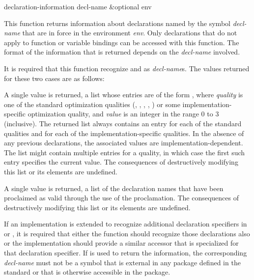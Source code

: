 \begin{defun}[Function]
declaration-information decl-name &optional env

  This function returns information about declarations named by the
  symbol \emph{decl-name} that are in force in the environment \emph{env}.
  Only declarations that do not apply to function or variable bindings
  can be accessed with this function.  The format of the information
  that is returned depends on the \emph{decl-name} involved.

  It is required that this function recognize  and  as
  \emph{decl-name\/}s.  The values returned for these two cases are as follows:
\begin{indentdesc}{7pc}
\item[\cdf{optimize}]
A single value is returned,
a list whose entries are of the form , where
                \emph{quality} is one of the standard optimization qualities
                (, , , , )
                or some implementation-specific optimization quality, and
                \emph{value} is an integer in the range 0 to 3 (inclusive).
                The returned list
                always contains an entry for each of the standard qualities and
                for each of the implementation-specific qualities.  In the
                absence of any previous declarations, the associated values are
                implementation-dependent.  The list might contain multiple
                entries for a quality, in which case the first such entry
                specifies the current value.
                The consequences of destructively modifying this list or
		its elements are undefined.
                

\item[\cdf{declaration}]
A single value is returned,
a list of the declaration names that have been proclaimed as
                valid through the use of the  proclamation.
                The consequences of destructively modifying this list or
		its elements are undefined.
\end{indentdesc}
  If an implementation is extended to recognize additional
  declaration specifiers in  or , it is required that
  either the  function should recognize those
  declarations also or the implementation should provide a similar accessor that is
  specialized for that declaration specifier.  If 
  is used to return the information, the corresponding \emph{decl-name} must not
  be a symbol that is external in any package defined in the standard or
  that is otherwise accessible in the  package.
\end{defun}

